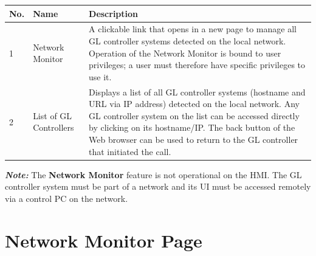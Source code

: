 \begin{longtable}[]{@{}lll@{}}
\toprule
\begin{minipage}[b]{0.04\columnwidth}\raggedright
No.\strut
\end{minipage} & \begin{minipage}[b]{0.23\columnwidth}\raggedright
Name\strut
\end{minipage} & \begin{minipage}[b]{0.65\columnwidth}\raggedright
Description\strut
\end{minipage}\tabularnewline
\midrule
\endhead
\begin{minipage}[t]{0.04\columnwidth}\raggedright
1\strut
\end{minipage} & \begin{minipage}[t]{0.23\columnwidth}\raggedright
Network Monitor\strut
\end{minipage} & \begin{minipage}[t]{0.65\columnwidth}\raggedright
A clickable link that opens in a new page to manage all GL controller
systems detected on the local network. Operation of the Network Monitor
is bound to user privileges; a user must therefore have specific
privileges to use it.\strut
\end{minipage}\tabularnewline
\begin{minipage}[t]{0.04\columnwidth}\raggedright
2\strut
\end{minipage} & \begin{minipage}[t]{0.23\columnwidth}\raggedright
List of GL Controllers\strut
\end{minipage} & \begin{minipage}[t]{0.65\columnwidth}\raggedright
Displays a list of all GL controller systems (hostname and URL via IP
address) detected on the local network. Any GL controller system on the
list can be accessed directly by clicking on its hostname/IP. The back
button of the Web browser can be used to return to the GL controller
that initiated the call.\strut
\end{minipage}\tabularnewline
\bottomrule
\end{longtable}

\textbf{\emph{Note:}} The \textbf{Network Monitor} feature is not
operational on the HMI. The GL controller system must be part of a
network and its UI must be accessed remotely via a control PC on the
network.


\section{Network Monitor Page}


